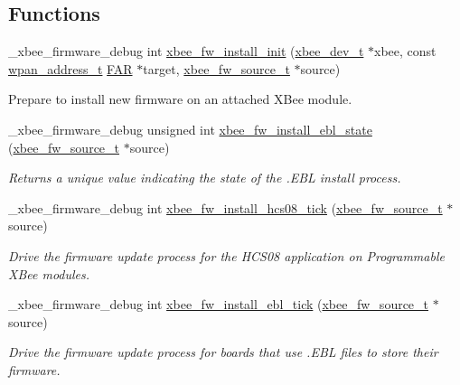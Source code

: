 \subsection*{Functions}
\begin{DoxyCompactItemize}
\item 
\+\_\+xbee\+\_\+firmware\+\_\+debug int \hyperlink{group__xbee__firmware_ga3ea95570f7d7366e42b0ee6ba21a1c41}{xbee\+\_\+fw\+\_\+install\+\_\+init} (\hyperlink{structxbee__dev__t}{xbee\+\_\+dev\+\_\+t} $\ast$xbee, const \hyperlink{structwpan__address__t}{wpan\+\_\+address\+\_\+t} \hyperlink{group__hal_gaef060b3456fdcc093a7210a762d5f2ed}{F\+AR} $\ast$target, \hyperlink{structxbee__fw__source__t}{xbee\+\_\+fw\+\_\+source\+\_\+t} $\ast$source)
\begin{DoxyCompactList}\small\item\em \begin{DoxyVerb}        Prepare to install new firmware on an attached XBee module.\end{DoxyVerb}
 \end{DoxyCompactList}\item 
\+\_\+xbee\+\_\+firmware\+\_\+debug unsigned int \hyperlink{group__xbee__firmware_ga8590708a38ac57ace8c816cc7cfd0859}{xbee\+\_\+fw\+\_\+install\+\_\+ebl\+\_\+state} (\hyperlink{structxbee__fw__source__t}{xbee\+\_\+fw\+\_\+source\+\_\+t} $\ast$source)
\begin{DoxyCompactList}\small\item\em Returns a unique value indicating the state of the .E\+BL install process. \end{DoxyCompactList}\item 
\+\_\+xbee\+\_\+firmware\+\_\+debug int \hyperlink{group__xbee__firmware_ga00113850eb74d0cb2928c9530d253381}{xbee\+\_\+fw\+\_\+install\+\_\+hcs08\+\_\+tick} (\hyperlink{structxbee__fw__source__t}{xbee\+\_\+fw\+\_\+source\+\_\+t} $\ast$source)
\begin{DoxyCompactList}\small\item\em Drive the firmware update process for the H\+C\+S08 application on Programmable X\+Bee modules. \end{DoxyCompactList}\item 
\+\_\+xbee\+\_\+firmware\+\_\+debug int \hyperlink{group__xbee__firmware_gaae62252a2e1331127c9df86b6ebfc4e8}{xbee\+\_\+fw\+\_\+install\+\_\+ebl\+\_\+tick} (\hyperlink{structxbee__fw__source__t}{xbee\+\_\+fw\+\_\+source\+\_\+t} $\ast$source)
\begin{DoxyCompactList}\small\item\em Drive the firmware update process for boards that use .E\+BL files to store their firmware. \end{DoxyCompactList}\item 

\end{DoxyCompactItemize}
